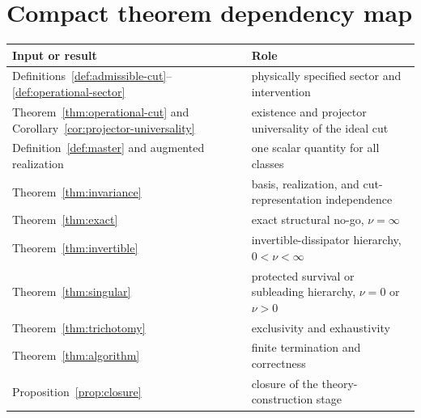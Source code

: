 \documentclass[11pt]{article}
\theoremstyle{definition}
\theoremstyle{remark}
\theoremstyle{plain}
\begin{document}
\section{Compact theorem dependency map}

\begin{center}
\begin{tabularx}{\textwidth}{@{}>{\raggedright\arraybackslash}p{}X@{}}
\toprule
Input or result & Role\\
\midrule
Definitions~\ref{def:admissible-cut}--\ref{def:operational-sector} & physically specified sector and intervention\\
Theorem~\ref{thm:operational-cut} and Corollary~\ref{cor:projector-universality} & existence and projector universality of the ideal cut\\
Definition~\ref{def:master} and augmented realization & one scalar quantity for all classes\\
Theorem~\ref{thm:invariance} & basis, realization, and cut-representation independence\\
Theorem~\ref{thm:exact} & exact structural no-go, $\nu=\infty$\\
Theorem~\ref{thm:invertible} & invertible-dissipator hierarchy, $0<\nu<\infty$\\
Theorem~\ref{thm:singular} & protected survival or subleading hierarchy, $\nu=0$ or $\nu>0$\\
Theorem~\ref{thm:trichotomy} & exclusivity and exhaustivity\\
Theorem~\ref{thm:algorithm} & finite termination and correctness\\
Proposition~\ref{prop:closure} & closure of the theory-construction stage\\
\bottomrule
\end{tabularx}
\end{center}
\end{document}

